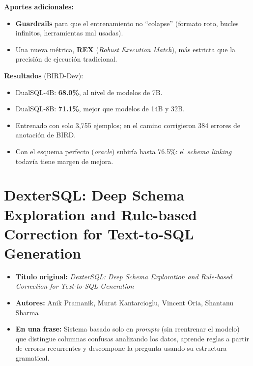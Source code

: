 \documentclass[11pt,a4paper]{article}
\newcommand{\ficha}[5]{%
  \begin{itemize}[leftmargin=*, label={}]
    \item \textbf{Título original:} \textit{#1}
    \item \textbf{Autores:} #2
    \item \textbf{En una frase:} #5
  \end{itemize}
}
\begin{document}
\textbf{Aportes adicionales:}
\begin{itemize}
  \item \textbf{Guardrails} para que el entrenamiento no ``colapse'' (formato roto, bucles infinitos, herramientas mal usadas).
  \item Una nueva métrica, \textbf{REX} (\textit{Robust Execution Match}), más estricta que la precisión de ejecución tradicional.
\end{itemize}

\textbf{Resultados} (BIRD-Dev):
\begin{itemize}
  \item DualSQL-4B: \textbf{68.0\%}, al nivel de modelos de 7B.
  \item DualSQL-8B: \textbf{71.1\%}, mejor que modelos de 14B y 32B.
  \item Entrenado con solo 3{,}755 ejemplos; en el camino corrigieron 384 errores de anotación de BIRD.
  \item Con el esquema perfecto (\textit{oracle}) subiría hasta 76.5\%: el \textit{schema linking} todavía tiene margen de mejora.
\end{itemize}

\section{DexterSQL: Deep Schema Exploration and Rule-based Correction for Text-to-SQL Generation}
\ficha
  {DexterSQL: Deep Schema Exploration and Rule-based Correction for Text-to-SQL Generation}
  {Anik Pramanik, Murat Kantarcioglu, Vincent Oria, Shantanu Sharma}
  {New Jersey Institute of Technology y Virginia Tech}
  {arXiv:2608.11889 (preprint), septiembre 2026}
  {Sistema basado solo en \textit{prompts} (sin reentrenar el modelo) que distingue columnas confusas analizando los datos, aprende reglas a partir de errores recurrentes y descompone la pregunta usando su estructura gramatical.}
\end{document}
